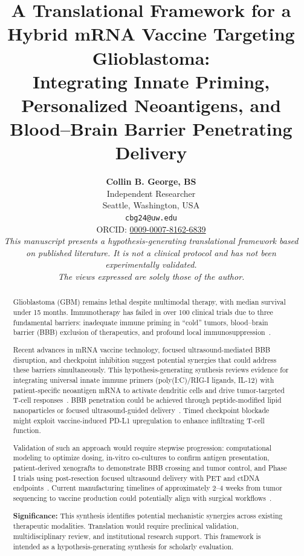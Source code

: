 \documentclass[12pt]{article}
\title{\textbf{A Translational Framework for a Hybrid mRNA Vaccine Targeting Glioblastoma:\\
Integrating Innate Priming, Personalized Neoantigens, and Blood--Brain Barrier Penetrating Delivery}}
\author{
\begin{minipage}{0.9\textwidth}
\centering
\textbf{Collin B. George, BS}\\
Independent Researcher\\
Seattle, Washington, USA\\[4pt]
\small \texttt{cbg24@uw.edu}\\[4pt]
\small ORCID: \href{https://orcid.org/0009-0007-8162-6839}{0009-0007-8162-6839}\\[10pt]
\footnotesize\textit{This manuscript presents a hypothesis-generating translational framework based on published literature. It is not a clinical protocol and has not been experimentally validated.}\\
\footnotesize\textit{The views expressed are solely those of the author.}
\end{minipage}
}
\date{}
\begin{document}
\maketitle
\thispagestyle{empty}

\newpage

\begin{abstract}
Glioblastoma (GBM) remains lethal despite multimodal therapy, with median survival under 15 months. Immunotherapy has failed in over 100 clinical trials due to three fundamental barriers: inadequate immune priming in ``cold'' tumors, blood--brain barrier (BBB) exclusion of therapeutics, and profound local immunosuppression~\citep{lim2024,chen2024}.

Recent advances in mRNA vaccine technology, focused ultrasound-mediated BBB disruption, and checkpoint inhibition suggest potential synergies that could address these barriers simultaneously. This hypothesis-generating synthesis reviews evidence for integrating universal innate immune primers (poly(I:C)/RIG-I ligands, IL-12) with patient-specific neoantigen mRNA to activate dendritic cells and drive tumor-targeted T-cell responses~\citep{oloruntimehin2025,aunins2025}. BBB penetration could be achieved through peptide-modified lipid nanoparticles or focused ultrasound-guided delivery~\citep{han2025,chen2024fus}. Timed checkpoint blockade might exploit vaccine-induced PD-L1 upregulation to enhance infiltrating T-cell function.

Validation of such an approach would require stepwise progression: computational modeling to optimize dosing, in-vitro co-cultures to confirm antigen presentation, patient-derived xenografts to demonstrate BBB crossing and tumor control, and Phase I trials using post-resection focused ultrasound delivery with PET and ctDNA endpoints~\citep{karimi2024,sayour2024,manfredi2024}. Current manufacturing timelines of approximately 2--4 weeks from tumor sequencing to vaccine production could potentially align with surgical workflows~\citep{wang2025,hilf2024}.

\noindent\textbf{Significance:} This synthesis identifies potential mechanistic synergies across existing therapeutic modalities. Translation would require preclinical validation, multidisciplinary review, and institutional research support. This framework is intended as a hypothesis-generating synthesis for scholarly evaluation.

\end{abstract}
\end{document}
